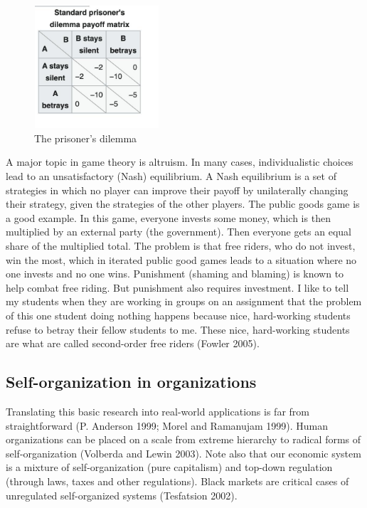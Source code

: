 \documentclass[
  letterpaper,
]{scrbook}
\begin{document}
\begin{figure}

{\centering \includegraphics[width=1.83969in,height=1.79483in]{media/ch4/image9.jpg}

}

\caption{\label{fig-ch4-img9}The prisoner's dilemma}

\end{figure}

A major topic in game theory is altruism. In many cases, individualistic
choices lead to an unsatisfactory (Nash) equilibrium. A Nash equilibrium
is a set of strategies in which no player can improve their payoff by
unilaterally changing their strategy, given the strategies of the other
players. The public goods game is a good example. In this game, everyone
invests some money, which is then multiplied by an external party (the
government). Then everyone gets an equal share of the multiplied total.
The problem is that free riders, who do not invest, win the most, which
in iterated public good games leads to a situation where no one invests
and no one wins. Punishment (shaming and blaming) is known to help
combat free riding. But punishment also requires investment. I like to
tell my students when they are working in groups on an assignment that
the problem of this one student doing nothing happens because nice,
hard-working students refuse to betray their fellow students to me.
These nice, hard-working students are what are called second-order free
riders (Fowler 2005).

\hypertarget{self-organization-in-organizations}{%
\subsection{Self-organization in
organizations}\label{self-organization-in-organizations}}

Translating this basic research into real-world applications is far from
straightforward (P. Anderson 1999; Morel and Ramanujam 1999). Human
organizations can be placed on a scale from extreme hierarchy to radical
forms of self-organization (Volberda and Lewin 2003). Note also that our
economic system is a mixture of self-organization (pure capitalism) and
top-down regulation (through laws, taxes and other regulations). Black
markets are critical cases of unregulated self-organized systems
(Tesfatsion 2002).
\end{document}
